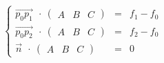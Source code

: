 \documentclass{article}
\begin{document}
\thispagestyle{empty}


$$
\left\{
\begin{array}{rll}
\overrightarrow{p_0p_1} ~~\cdot~ \begin{pmatrix}A&B&C\end{pmatrix} &=& f_1-f_0 \\
\overrightarrow{p_0p_2} ~~\cdot~ \begin{pmatrix}A&B&C\end{pmatrix} &=& f_2-f_0 \\
\vec{n}~~\cdot~ \begin{pmatrix}A&B&C\end{pmatrix} &=& 0
\end{array}
\right.
$$
\end{document}
